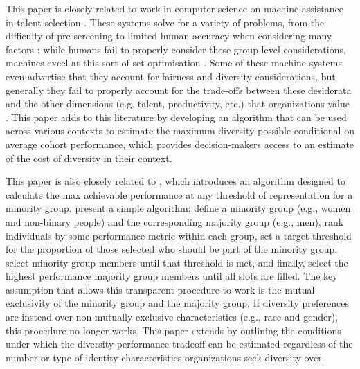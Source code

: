 This paper is closely related to work in computer science on machine assistance in talent selection \cite{dwivedi2021artificial, tambe2019artificial, raghavan2020mitigating}. These systems solve for a variety of problems, from the difficulty of pre-screening to limited human accuracy when considering many factors \cite{tambe2019artificial}; while humans fail to properly consider these group-level considerations, machines excel at this sort of set optimisation \cite{krause2014submodular}. Some of these machine systems even advertise that they account for fairness and diversity considerations, but generally they fail to properly account for the trade-offs between these desiderata and the other dimensions (e.g. talent, productivity, etc.) that organizations value \cite{raghavan2020mitigating, gillet2011diversity,huppenkothen2020entrofy}. This paper adds to this literature by developing an algorithm that can be used across various contexts to estimate the maximum diversity possible conditional on average cohort performance, which provides decision-makers access to an estimate of the cost of diversity in their context. 

This paper is also closely related to \textcite{kleinberg2018algorithmic}, which introduces an algorithm designed to calculate the max achievable performance at any threshold of representation for a minority group. \textcite{kleinberg2018algorithmic} present a simple algorithm: define a minority group (e.g., women and non-binary people) and the corresponding majority group (e.g., men), rank individuals by some performance metric within each group, set a target threshold for the proportion of those selected who should be part of the minority group, select minority group members until that threshold is met, and finally, select the highest performance majority group members until all slots are filled. The key assumption that allows this transparent procedure to work is the mutual exclusivity of the minority group and the majority group. If diversity preferences are instead over non-mutually exclusive characteristics (e.g., race and gender), this procedure no longer works. This paper extends \textcite{kleinberg2018algorithmic} by outlining the conditions under which the diversity-performance tradeoff can be estimated regardless of the number or type of identity characteristics organizations seek diversity over.

